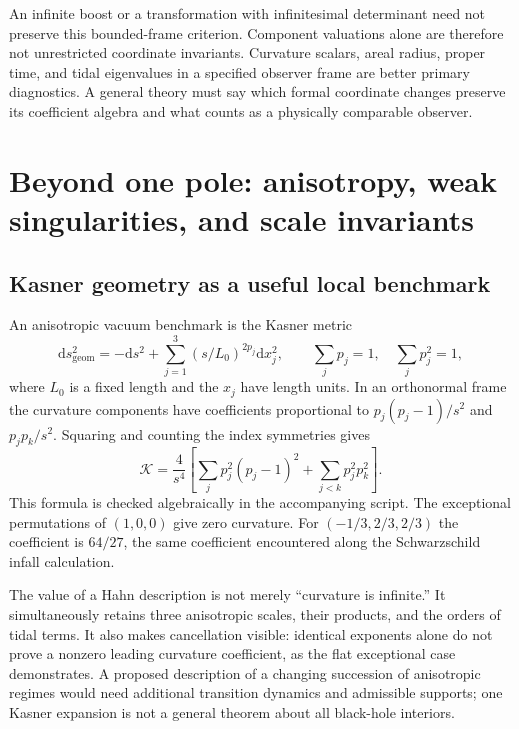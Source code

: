 \documentclass[11pt,a4paper]{article}
\numberwithin{equation}{section}
\theoremstyle{definition}
\theoremstyle{remark}
\newcommand{\dd}{\mathrm d}
\newcommand{\Krets}{\mathcal K}
\begin{document}
An infinite boost or a transformation with infinitesimal determinant need not preserve this bounded-frame criterion. Component valuations alone are therefore not unrestricted coordinate invariants. Curvature scalars, areal radius, proper time, and tidal eigenvalues in a specified observer frame are better primary diagnostics. A general theory must say which formal coordinate changes preserve its coefficient algebra and what counts as a physically comparable observer.

\section{Beyond one pole: anisotropy, weak singularities, and scale invariants}
\label{sec:other}

\subsection{Kasner geometry as a useful local benchmark}
An anisotropic vacuum benchmark is the Kasner metric
\begin{equation}\label{eq:kasner}
 \dd s_{\mathrm{geom}}^2=-\dd s^2
 +\sum_{j=1}^3(s/L_0)^{2p_j}\dd x_j^2,
 \qquad \sum_jp_j=1,\quad\sum_jp_j^2=1,
\end{equation}
where $L_0$ is a fixed length and the $x_j$ have length units. In an orthonormal frame the curvature components have coefficients proportional to $p_j(p_j-1)/s^2$ and $p_jp_k/s^2$. Squaring and counting the index symmetries gives
\begin{equation}\label{eq:kasnerK}
 \Krets=\frac{4}{s^4}
 \left[\sum_jp_j^2(p_j-1)^2+\sum_{j<k}p_j^2p_k^2\right].
\end{equation}
This formula is checked algebraically in the accompanying script. The exceptional permutations of $(1,0,0)$ give zero curvature. For $(-1/3,2/3,2/3)$ the coefficient is $64/27$, the same coefficient encountered along the Schwarzschild infall calculation.

The value of a Hahn description is not merely ``curvature is infinite.'' It simultaneously retains three anisotropic scales, their products, and the orders of tidal terms. It also makes cancellation visible: identical exponents alone do not prove a nonzero leading curvature coefficient, as the flat exceptional case demonstrates. A proposed description of a changing succession of anisotropic regimes would need additional transition dynamics and admissible supports; one Kasner expansion is not a general theorem about all black-hole interiors.
\end{document}

